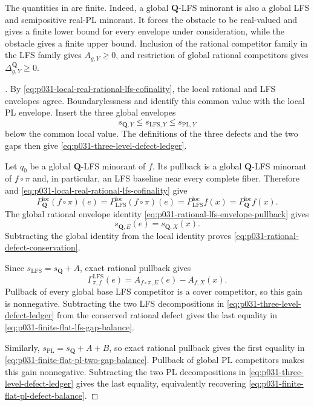 
The quantities in  are finite.
Indeed, a global $\mathbf Q$-LFS minorant is also a global LFS and
semipositive real-PL minorant.  It forces the obstacle to be real-valued and
gives a finite lower bound for every envelope under consideration, while
the obstacle gives a finite upper bound.  Inclusion of the rational
competitor family in the LFS family gives $A_{g,Y}\geq0$, and restriction
of global rational competitors gives
$\Delta^{\mathbf Q}_{g,Y}\geq0$.

\begin{proof}[]
By \eqref{eq:p031-local-real-rational-lfs-cofinality}, the local rational
and LFS envelopes agree.  Boundarylessness and
 identify this common value with the
local PL envelope.  Insert the three global envelopes
\[
             s_{\mathbf Q,Y}\leq s_{\mathrm{LFS},Y}
                    \leq s_{\mathrm{PL},Y}
\]
below the common local value.  The definitions of the three defects and
the two gaps then give
\eqref{eq:p031-three-level-defect-ledger}.

Let $q_0$ be a global $\mathbf Q$-LFS minorant of $f$.  Its pullback is a
global $\mathbf Q$-LFS minorant of $f\circ\pi$ and, in particular, an
LFS baseline near every complete fiber.  Therefore
 and
\eqref{eq:p031-local-real-rational-lfs-cofinality} give
\[
 P_{\mathbf Q}^{\mathrm{loc}}(f\circ\pi)(e)
   =P_{\mathrm{LFS}}^{\mathrm{loc}}(f\circ\pi)(e)
   =P_{\mathrm{LFS}}^{\mathrm{loc}}f(x)
   =P_{\mathbf Q}^{\mathrm{loc}}f(x).
\]
The global rational envelope identity
\eqref{eq:p031-rational-lfs-envelope-pullback} gives
\[
                         s_{\mathbf Q,E}(e)
                              =s_{\mathbf Q,X}(x).
\]
Subtracting the global identity from the local identity proves
\eqref{eq:p031-rational-defect-conservation}.

Since $s_{\mathrm{LFS}}=s_{\mathbf Q}+A$, exact rational pullback gives
\[
 \Gamma^{\mathrm{LFS}}_{\pi,f}(e)
   =A_{f\circ\pi,E}(e)-A_{f,X}(x).
\]
Pullback of every global base LFS competitor is a cover competitor, so this
gain is nonnegative.  Subtracting the two LFS decompositions in
\eqref{eq:p031-three-level-defect-ledger} from the conserved rational
defect gives the last equality in
\eqref{eq:p031-finite-flat-lfs-gap-balance}.

Similarly, $s_{\mathrm{PL}}=s_{\mathbf Q}+A+B$, so exact rational
pullback gives the first equality in
\eqref{eq:p031-finite-flat-pl-two-gap-balance}.  Pullback of global PL
competitors makes this gain nonnegative.  Subtracting the two PL
decompositions in \eqref{eq:p031-three-level-defect-ledger} gives the
last equality, equivalently recovering
\eqref{eq:p031-finite-flat-pl-defect-balance}.


\end{proof}
